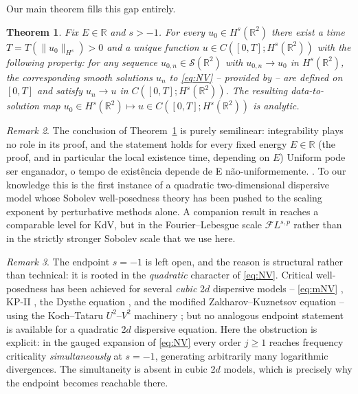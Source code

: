 \documentclass[a4paper,
11pt,  reqno]{amsart}
\newcommand{\blue}{\color{blue}}
\newcommand{\orange}{\color{orange}}
\newcommand{\5}{\textup{V}}
\newtheorem{theorem}{Theorem} [section]
\theoremstyle{remark}
\newtheorem{remark}[theorem]{Remark}
\newcommand{\R}{\mathbb{R}}
\numberwithin{equation}{section}
\numberwithin{theorem}{section}
\begin{document}
\medskip

Our main theorem fills this gap entirely.

\begin{theorem}\label{thm:main_intro}
Fix $E\in\R$ and $s>-1$. For every $u_0\in H^s(\R^2)$ there exist a time $T=T(\|u_0\|_{H^s})>0$ and a unique function $u\in C([0,T];H^s(\R^2))$ with the following property: for any sequence $u_{0,n}\in\mathcal{S}(\R^2)$ with $u_{0,n}\to u_0$ in $H^s(\R^2)$, the corresponding smooth solutions $u_n$ to \eqref{eq:NV} -- provided by \cite{angelopolous, kazeykinamunoz1, kazeykinamunoz2} -- are defined on $[0,T]$ and satisfy $u_n\to u$ in $C([0,T];H^s(\R^2))$. The resulting data-to-solution map $u_0\in H^s(\R^2)\mapsto u\in C([0,T];H^s(\R^2))$ is analytic.
\end{theorem}

\begin{remark}
The conclusion of Theorem~\ref{thm:main_intro} is purely semilinear: integrability plays no role in its proof, and the statement {\orange holds for every fixed energy $E\in\R$ (the proof, and in particular the local existence time, depending on $E$)} {\blue Uniform pode ser enganador, o tempo de existência depende de E não-uniformemente. }. To our knowledge this is the first instance of a quadratic two-dimensional dispersive model whose Sobolev well-posedness theory has been pushed to the scaling exponent by perturbative methods alone. A companion result in \cite{chcora} reaches a comparable level for KdV, but in the Fourier--Lebesgue scale $\mathcal{F}L^{s,p}$ rather than in the strictly stronger Sobolev scale that we use here.
\end{remark}

\begin{remark}
The endpoint $s=-1$ is left open, and the reason is structural rather than technical: it is rooted in the \emph{quadratic} character of \eqref{eq:NV}. Critical well-posedness has been achieved for several \emph{cubic} 2$d$ dispersive models -- \eqref{eq:mNV} \cite{Schottdorf}, KP-II \cite{HHK}, the Dysthe equation \cite{MPS_Dysthe}, and the modified Zakharov--Kuznetsov equation \cite{CorreiaKinoshita} -- using the Koch--Tataru $U^2$--$V^2$ machinery \cite{KochTataru}; but no analogous endpoint statement is available for a quadratic 2$d$ dispersive equation. Here the obstruction is explicit: in the gauged expansion of \eqref{eq:NV} every order $j\ge 1$ reaches frequency criticality \emph{simultaneously} at $s=-1$, generating arbitrarily many logarithmic divergences. The simultaneity is absent in cubic 2$d$ models, which is precisely why the endpoint becomes reachable there.
\end{remark}
\end{document}
